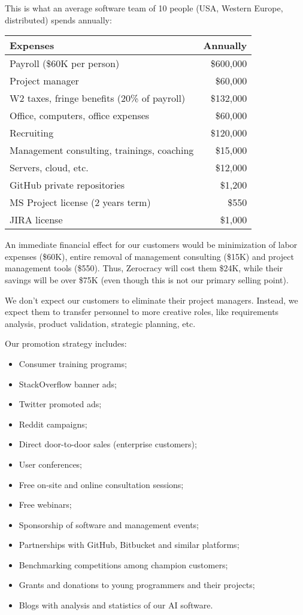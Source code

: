 \documentclass{main}
\begin{document}
This is what an average software team of 10 people (USA, Western Europe, distributed) spends annually:

\begin{tabular}{lr}
\hline
Expenses & Annually \\
\hline
Payroll (\$60K per person) & \$600,000 \\
Project manager & \$60,000 \\
W2 taxes, fringe benefits (20\% of payroll) & \$132,000 \\
Office, computers, office expenses & \$60,000 \\
Recruiting & \$120,000 \\
Management consulting, trainings, coaching & \$15,000 \\
Servers, cloud, etc. & \$12,000 \\
GitHub private repositories & \$1,200 \\
MS Project license (2 years term) & \$550 \\
JIRA license & \$1,000 \\
\hline
\end{tabular}
\vspace{1em}

An immediate financial effect for our customers would be minimization of labor
expenses (\$60K), entire removal of management consulting (\$15K) and project
management tools (\$550). Thus, Zerocracy will cost them \$24K, while their
savings will be over \$75K (even though this is not our primary selling point).

We don't expect our customers to eliminate their project managers. Instead, we
expect them to transfer personnel to more creative roles, like requirements
analysis, product validation, strategic planning, etc.

Our promotion strategy includes:

\begin{itemize}\itemsep0em
  \item Consumer training programs;
  \item StackOverflow banner ads;
  \item Twitter promoted ads;
  \item Reddit campaigns;
  \item Direct door-to-door sales (enterprise customers);
  \item User conferences;
  \item Free on-site and online consultation sessions;
  \item Free webinars;
  \item Sponsorship of software and management events;
  \item Partnerships with GitHub, Bitbucket and similar platforms;
  \item Benchmarking competitions among champion customers;
  \item Grants and donations to young programmers and their projects;
  \item Blogs with analysis and statistics of our AI software.
\end{itemize}
\end{document}

